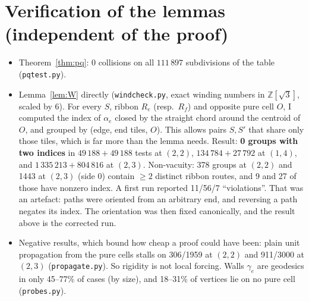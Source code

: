 \documentclass[11pt]{article}
\theoremstyle{definition}
\begin{document}
\section{Verification of the lemmas (independent of the proof)}
\begin{itemize}
\item Theorem~\ref{thm:pq}: 0 collisions on all $111\,897$ subdivisions of the table (\texttt{pqtest.py}).
\item Lemma~\ref{lem:W} directly (\texttt{windcheck.py}, exact winding numbers in $\mathbb Z[\sqrt3]$, scaled by 6). For every $S$, ribbon $R_e$ (resp.\ $R_f$) and opposite
pure cell $O$, I computed the index of $\alpha_e$ closed by the straight chord around the centroid of $O$, and grouped by (edge, end tiles, $O$). This allows pairs $S,S'$ that share only those tiles,
which is far more than the lemma needs. Result: \textbf{0 groups with two indices} in $49\,188+49\,188$ tests at $(2,2)$, $134\,784+27\,792$ at $(1,4)$, and
$1\,335\,213+804\,816$ at $(2,3)$. Non-vacuity: 378 groups at $(2,2)$ and 1443 at $(2,3)$ (side 0) contain $\ge2$ distinct ribbon routes, and
9 and 27 of those have nonzero index. A first run reported 11/56/7 ``violations''. That was an artefact: paths were oriented from an arbitrary end, and reversing a path negates its index.
The orientation was then fixed canonically, and the result above is the corrected run.
\item Negative results, which bound how cheap a proof could have been: plain unit propagation from the pure cells stalls on 306/1959 at $(2,2)$ and 911/3000 at $(2,3)$
(\texttt{propagate.py}). So rigidity is not local forcing. Walls $\gamma_e$ are geodesics in only 45--77\% of cases (by size), and 18--31\% of vertices lie on no pure cell (\texttt{probes.py}).
\end{itemize}
\end{document}
